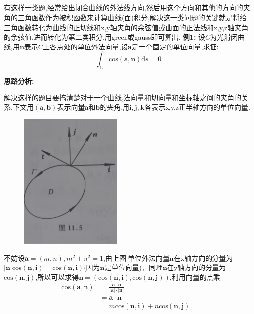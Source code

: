 \documentclass{ctexart}
\begin{document}
\subsection*{}

有这样一类题,经常给出闭合曲线的外法线方向,然后用这个方向和其他的方向的夹角的三角函数作为被积函数来计算曲线(面)积分,解决这一类问题的关键就是将给三角函数转化为曲线的正切线和x,y轴夹角的余弦值或曲面的正法线和x,y,z轴夹角的余弦值,进而转化为第二类积分,用green或gauss即可算出.
\newline
\newline
\indent\textbf{例1:}
设$C$为光滑闭曲线,用$\bm{n}$表示$C$上各点处的单位外法向量,设$\bm{a}$是一个固定的单位向量,求证:
$$\int_{C}\mathrm{cos}(\bm{a,n})\mathrm{d}s=0$$

\textbf{思路分析:}

解决这样的题目要搞清楚对于一个曲线,法向量和切向量和坐标轴之间的夹角的关系,下文用$(\bm{a},\bm{b})$表示向量$\bm{a}$和$\bm{b}$的夹角,用$\bm{i},\bm{j},\bm{k}$各表示x,y,z正半轴方向的单位向量.

\begin{figure}[!h]
  \centering

  \includegraphics[width=5cm]{5.jpg}\\

\end{figure}

不妨设$\bm{a}=(m,n),m^{2}+n^{2}=1$,由上图,单位外法向量$\bm{n}$在x轴方向的分量为$|\bm{n}|\mathrm{cos}(\bm{n},\bm{i})=\mathrm{cos}(\bm{n},\bm{i})$(因为$\bm{n}$是单位向量)，同理$\bm{n}$在y轴方向的分量为$\mathrm{cos}(\bm{n},\bm{j})$,所以可以求得$\bm{n}=(\mathrm{cos}(\bm{n},\bm{i}),\mathrm{cos}(\bm{n},\bm{j}))$,利用向量的点乘
\begin{align}
\mathrm{cos}(\bm{a,n})&=\frac{\bm{a}\cdot\bm{n}}{|\bm{a}|\cdot|\bm{n}|}&\nonumber\\
&=\bm{a}\cdot\bm{n}&\nonumber\\
&=m\mathrm{cos}(\bm{n},\bm{i})+n\mathrm{cos}(\bm{n},\bm{j})
\end{align}
\end{document}
